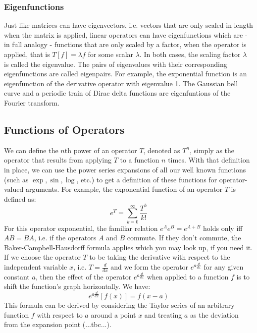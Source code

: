 \subsubsection{Eigenfunctions}
Just like matrices can have eigenvectors, i.e. vectors that are only scaled in length when the matrix is applied, linear operators can have eigenfunctions which are - in full analogy - functions that are only scaled by a factor, when the operator is applied, that is $T[f] = \lambda f$ for some scalar $\lambda$. In both cases, the scaling factor $\lambda$ is called the eigenvalue. The pairs of eigenvalues with their corresponding eigenfunctions are called eigenpairs. For example, the exponential function is an eigenfunction of the derivative operator with eigenvalue 1. The Gaussian bell curve and a periodic train of Dirac delta functions are eigenfuntions of the Fourier transform.


\subsection{Functions of Operators}
We can define the $n$th power of an operator $T$, denoted as $T^n$, simply as the operator that results from applying $T$ to a function $n$ times. With that definition in place, we can use the power series expansions of all our well known functions (such as $\exp, \sin, \log$, etc.) to get a definition of these functions for operator-valued arguments. For example, the exponential function of an operator $T$ is defined as:
\begin{equation}
  e^T = \sum_{k=0}^{\infty} \frac{T^k}{k!}
\end{equation}
For this operator exponential, the familiar relation $e^A e^B = e^{A + B}$ holds only iff $A B = B A$, i.e. if the operators $A$ and $B$ commute. If they don't commute, the Baker-Campbell-Hausdorff formula applies which you may look up, if you need it. If we choose the operator $T$ to be taking the derivative with respect to the independent variable $x$, i.e. $T = \frac{d}{dx}$ and we form the operator $e^{a \frac{d}{dx}}$ for any given constant $a$, then the effect of the operator $e^{a \frac{d}{dx}}$ when applied to a function $f$ is to shift the function's graph horizontally. We have: 
\begin{equation}
  e^{a \frac{d}{dx}} [f(x)] = f(x-a)
\end{equation}
This formula can be derived by considering the Taylor series of an arbitrary function $f$ with respect to $a$ around a point $x$ and treating $a$ as the deviation from the expansion point (...tbc...).



